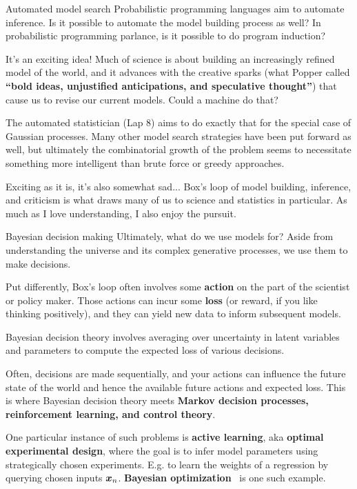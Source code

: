 \documentclass[aspectratio=169]{beamer}
\begin{document}
\begin{frame}{Automated model search}
    Probabilistic programming languages aim to automate inference. Is it possible to automate the model building process as well? In probabilistic programming parlance, is it possible to do program induction?
    
    It's an exciting idea! Much of science is about building an increasingly refined model of the world, and it advances with the creative sparks (what Popper called \textbf{``bold ideas, unjustified anticipations, and speculative thought''}) that cause us to revise our current models. Could a machine do that?
    
    The automated statistician (Lap 8) aims to do exactly that for the special case of Gaussian processes. Many other model search strategies have been put forward as well, but ultimately the combinatorial growth of the problem seems to necessitate something more intelligent than brute force or greedy approaches. 
    
    Exciting as it is, it's also somewhat sad... Box's loop of model building, inference, and criticism is what draws many of us to science and statistics in particular. As much as I love understanding, I also enjoy the pursuit.  
    
\end{frame}

\begin{frame}{Bayesian decision making}
Ultimately, what do we use models for?  Aside from understanding the universe and its complex generative processes, we use them to make decisions. 

Put differently, Box's loop often involves some \textbf{action} on the part of the scientist or policy maker. Those actions can incur some \textbf{loss} (or reward, if you like thinking positively), and they can yield new data to inform subsequent models. 

Bayesian decision theory involves averaging over uncertainty in latent variables and parameters to compute the expected loss of various decisions. 

Often, decisions are made sequentially, and your actions can influence the future state of the world and hence the available future actions and expected loss. This is where Bayesian decision theory meets \textbf{Markov decision processes, reinforcement learning, and control theory}.

One particular instance of such problems is \textbf{active learning}, aka \textbf{optimal experimental design}, where the goal is to infer model parameters using strategically chosen experiments. E.g. to learn the weights of a regression by querying chosen inputs $\boldsymbol{x}_n$. \textbf{Bayesian optimization}~\citep{shahriari2015taking} is one such example. 

\end{frame}
\end{document}
